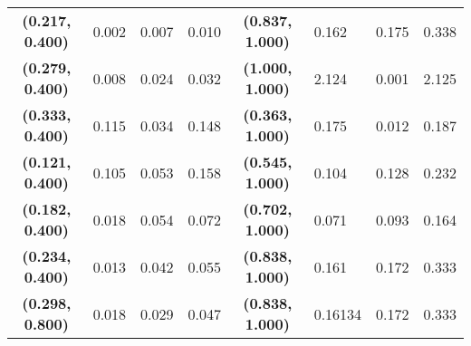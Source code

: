 \begin{table}[H]
{\begin{tabular}{@{}clllc|lll@{}}
\textbf{(0.217, 0.400)}   & 0.002                 & 0.007                   & 0.010                   & \textbf{(0.837, 1.000)}   & 0.162                 & 0.175                   & 0.338                   \\
\textbf{(0.279, 0.400)}   & 0.008                 & 0.024                   & 0.032                   & \textbf{(1.000, 1.000)}   & 2.124                 & 0.001                   & 2.125                   \\
\textbf{(0.333, 0.400)}   & 0.115                 & 0.034                   & 0.148                   & \textbf{(0.363, 1.000)}   & 0.175                 & 0.012                   & 0.187                   \\
\textbf{(0.121, 0.400)}   & 0.105                 & 0.053                   & 0.158                   & \textbf{(0.545, 1.000)}   & 0.104                 & 0.128                   & 0.232                   \\
\textbf{(0.182, 0.400)}   & 0.018                 & 0.054                   & 0.072                   & \textbf{(0.702, 1.000)}   & 0.071                 & 0.093                   & 0.164                   \\
\textbf{(0.234, 0.400)}   & 0.013                 & 0.042                   & 0.055                   & \textbf{(0.838, 1.000)}   & 0.161                 & 0.172                   & 0.333                   \\
\textbf{(0.298, 0.800)}   & 0.018                 & 0.029                   & 0.047                   & \textbf{(0.838, 1.000)}   & 0.16134               & 0.172                & 0.333               \\ \bottomrule
\end{tabular}%
}
\end{table}
